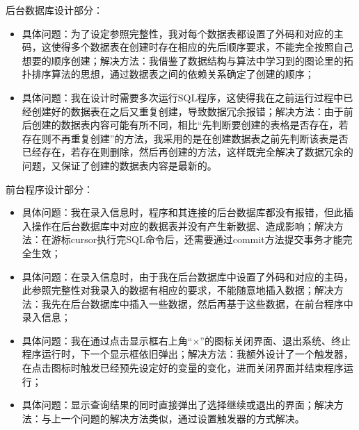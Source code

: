 \documentclass {article}
\begin{document}
		后台数据库设计部分：
		\begin{itemize}
			\item 具体问题：为了设定参照完整性，我对每个数据表都设置了外码和对应的主码，这使得多个数据表在创建时存在相应的先后顺序要求，不能完全按照自己想要的顺序创建；解决方法：我借鉴了数据结构与算法中学习到的图论里的拓扑排序算法的思想，通过数据表之间的依赖关系确定了创建的顺序；
			\item 具体问题：我在设计时需要多次运行SQL程序，这使得我在之前运行过程中已经创建好的数据表在之后又重复创建，导致数据冗余报错；解决方法：由于前后创建的数据表内容可能有所不同，相比“先判断要创建的表格是否存在，若存在则不再重复创建”的方法，我采用的是在创建数据表之前先判断该表是否已经存在，若存在则删除，然后再创建的方法，这样既完全解决了数据冗余的问题，又保证了创建的数据表内容是最新的。
		\end{itemize}
	
		前台程序设计部分：
		\begin{itemize}
			\item 具体问题：我在录入信息时，程序和其连接的后台数据库都没有报错，但此插入操作在后台数据库中对应的数据表并没有产生新数据、造成影响；解决方法：在游标cursor执行完SQL命令后，还需要通过commit方法提交事务才能完全生效；
			\item 具体问题：在录入信息时，由于我在后台数据库中设置了外码和对应的主码，此参照完整性对我录入的数据有相应的要求，不能随意地插入数据；解决方法：我先在后台数据库中插入一些数据，然后再基于这些数据，在前台程序中录入信息；
			\item 具体问题：我在通过点击显示框右上角“×”的图标关闭界面、退出系统、终止程序运行时，下一个显示框依旧弹出；解决方法：我额外设计了一个触发器，在点击图标时触发已经预先设定好的变量的变化，进而关闭界面并结束程序运行；
			\item 具体问题：显示查询结果的同时直接弹出了选择继续或退出的界面；解决方法：与上一个问题的解决方法类似，通过设置触发器的方式解决。
		\end{itemize}
	
\end{document}
